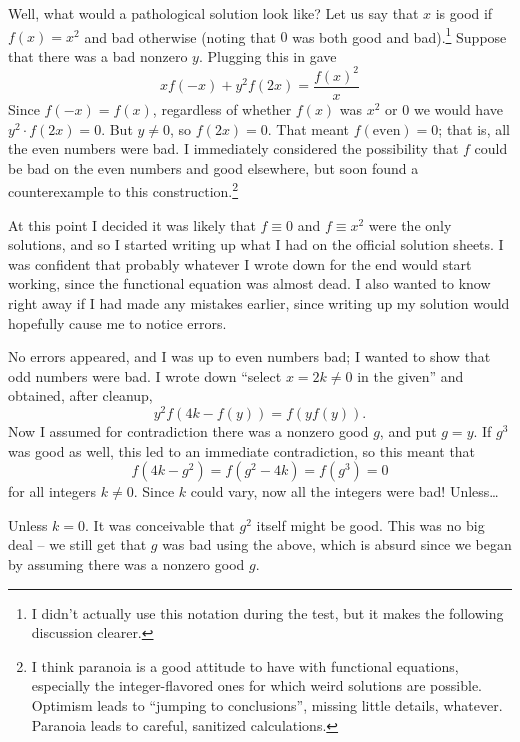 \documentclass[11pt]{scrartcl}
\begin{document}
Well, what would a pathological solution look like?
Let us say that $x$ is good if $f(x) = x^2$ and bad otherwise (noting that $0$
was both good and bad).\footnote{I didn't actually use this notation during the test,
but it makes the following discussion clearer.} Suppose that there was a bad nonzero $y$.
Plugging this in gave
\[ xf(-x) + y^2 f(2x) = \frac{f(x)^2}{x} \]
Since $f(-x) = f(x)$, regardless of whether $f(x)$ was $x^2$ or $0$ we would have $y^2 \cdot f(2x) = 0$.
But $y \neq 0$, so $f(2x) = 0$.
That meant $f(\text{even}) = 0$; that is, all the even numbers were bad.
I immediately considered the possibility that $f$ could be bad on the even numbers and good elsewhere,
but soon found a counterexample to this construction.\footnote{I think paranoia
is a good attitude to have with functional equations,
especially the integer-flavored ones for which weird solutions are possible.
Optimism leads to ``jumping to conclusions'', missing little details, whatever.
Paranoia leads to careful, sanitized calculations.}

At this point I decided it was likely that $f \equiv 0$ and $f \equiv x^2$ were the only solutions,
and so I started writing up what I had on the official solution sheets.
I was confident that probably whatever I wrote down for the end would start working,
since the functional equation was almost dead.
I also wanted to know right away if I had made any mistakes earlier,
since writing up my solution would hopefully cause me to notice errors.

No errors appeared, and I was up to even numbers bad; I wanted to show that odd numbers were bad.
I wrote down ``select $x=2k \neq 0$ in the given'' and obtained, after cleanup,
\[ y^2 f(4k - f(y)) = f(yf(y)). \]
Now I assumed for contradiction there was a nonzero good $g$, and put $g=y$.
If $g^3$ was good as well, this led to an immediate contradiction, so this meant that
\[ f(4k-g^2) = f(g^2-4k) = f(g^3) = 0 \]
for all integers $k \neq 0$. Since $k$ could vary, now all the integers were bad! Unless\dots

Unless $k=0$. It was conceivable that $g^2$ itself might be good.
This was no big deal -- we still get that $g$ was bad using the above,
which is absurd since we began by assuming there was a nonzero good $g$.
\end{document}
